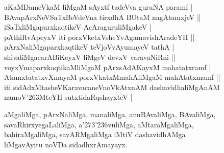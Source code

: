 \begin{entry}
\begin{shl}
aKaMDameVkaM liMgaM sAyxtf tadeVva guruNA paramf |\\
BAvapArxNeVSaTxBeVdeVna tirxdhA BUtaM nagAtamxjeV ||\\
iSaTxliMgaparxkaqtikeV AcAraguruliMgakeV |\\
pAthiRvApeyxV iti porxVketxVsheYvAgamavishAradeYH ||\\
pArxNaliMgaparxkaqtikeV teVjoVvAyumayeV tathA |\\
shivaliMgacarABiKeyxV liMgeV devxV varavaNiRni ||\\
voyxVmaparxkaqtikaMliMgaM pArxsAdAKayxM mahatatxramf |\\
AtamxtatatxvXmayaM porxVkatxMmahAliMgaM mahAtatxmamf ||\\
iti sidAdxMtasheVKaravacaneVnoVkAtxnAM dashavidhaliMgAnAM namoV{\char'263}MteYH sutxtidaRqshayxteV |
\end{shl}
\end{entry}

\begin{entry}
\gl{}
\begin{shl}
aMgaliMga, pArxNaliMga, manaliMga, anuBAvaliMga, BAvaliMga,\\ 
savaRkirxyegaLaliMga, a\char'273\char'236vuliMga, aMtaraMgaliMga,\\
bahiraMgaliMga, savARMgaliMga iMtiV dashavidhAMga\\ 
liMgavAyitu noVDa sidadhxrAmayayx.
\end{shl}
\end{entry}

